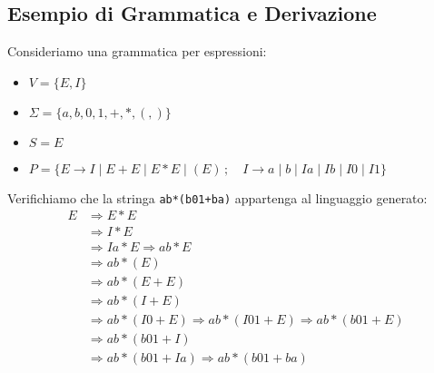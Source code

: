 \subsection{Esempio di Grammatica e Derivazione}
Consideriamo una grammatica per espressioni:
\begin{itemize}
    \item $V = \{E, I\}$
    \item $\Sigma = \{a, b, 0, 1, +, *, (, )\}$
    \item $S = E$
    \item $P = \{ E \rightarrow I \mid E+E \mid E*E \mid (E) \, ; \quad I \rightarrow a \mid b \mid Ia \mid Ib \mid I0 \mid I1 \}$
\end{itemize}

Verifichiamo che la stringa \texttt{ab*(b01+ba)} appartenga al linguaggio generato:
\begin{align*}
E & \Rightarrow E * E \\
  & \Rightarrow I * E \\
  & \Rightarrow Ia * E \Rightarrow ab * E \\
  & \Rightarrow ab * (E) \\
  & \Rightarrow ab * (E + E) \\
  & \Rightarrow ab * (I + E) \\
  & \Rightarrow ab * (I0 + E) \Rightarrow ab * (I01 + E) \Rightarrow ab * (b01 + E) \\
  & \Rightarrow ab * (b01 + I) \\
  & \Rightarrow ab * (b01 + Ia) \Rightarrow ab * (b01 + ba)
\end{align*}

